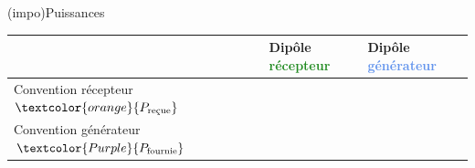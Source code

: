 \documentclass[../../main/main.tex]{subfiles}
\begin{document}
\begin{tcb}[label=impo:convrg](impo){Puissances}
	\begin{tabularx}{\linewidth}{|Y*{2}{|Y}|}\hline
		                                                     &
		Dipôle \textcolor{ForestGreen}{récepteur}            &
		Dipôle \textcolor{CornflowerBlue}{générateur}
		\\\hline
		Convention récepteur
		\smallbreak $\textcolor{orange}{P_{\text{reçue}}}$   &
		                                                     &
		\\\hline
		Convention générateur
		\smallbreak $\textcolor{Purple}{P_{\text{fournie}}}$ &
\end{tabularx}
\end{tcb}
\end{document}
